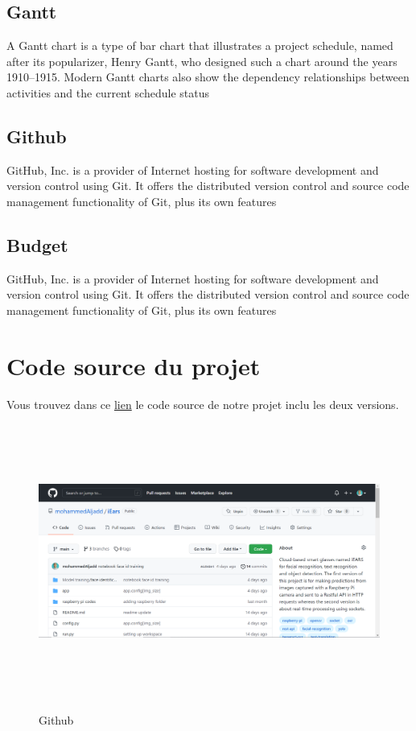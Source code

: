 {\section{Gantt}
A Gantt chart is a type of bar chart that illustrates a project schedule, named after its popularizer, Henry Gantt, who designed such a chart around the years 1910–1915. Modern Gantt charts also show the dependency relationships between activities and the current schedule status

\section{Github}
GitHub, Inc. is a provider of Internet hosting for software development and version control using Git. It offers the distributed version control and source code management functionality of Git, plus its own features

\section{Budget}
GitHub, Inc. is a provider of Internet hosting for software development and version control using Git. It offers the distributed version control and source code management functionality of Git, plus its own features



\pagebreak
{}
\chapter{Code source du projet}\thispagestyle{fancy}
Vous trouvez dans ce \href{https://github.com/mohammedAljadd/iEars}{lien} le code source de notre projet inclu les deux versions.\\

\begin{center}
\begin{figure}[h]
\centering
\includegraphics[width=18cm, height=9cm]{4-Images/github.PNG}\\[2cm]
\caption{Github}
\label{fig:figure2}
\end{figure}
\Large


\end{center}}
